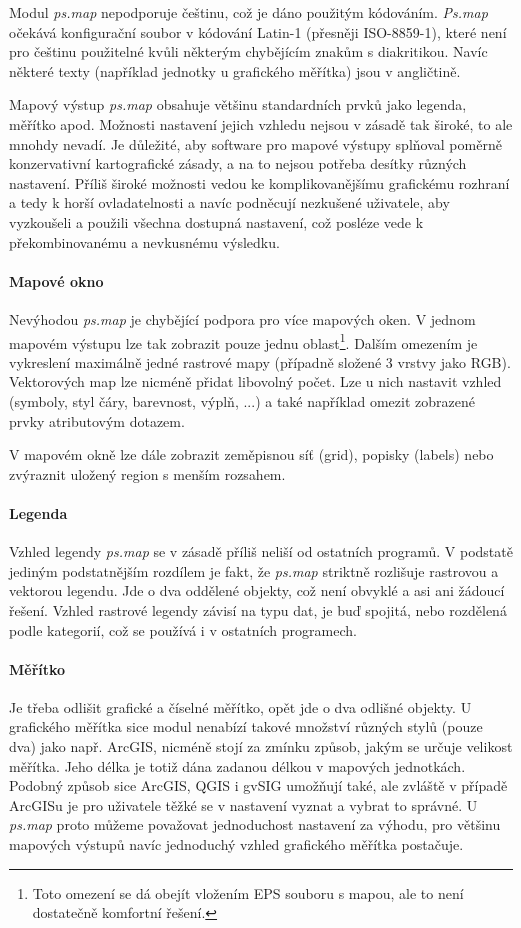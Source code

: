 \documentclass[a4paper,12pt,draft]{article}
\newcommand{\modul}[1]{\emph{#1}}
\begin{document}
Modul \modul{ps.map} nepodporuje češtinu, což je dáno použitým kódováním. \modul{Ps.map} očekává konfigurační soubor v kódování Latin-1 (přesněji ISO-8859-1), které není pro češtinu použitelné kvůli některým chybějícím znakům s diakritikou. Navíc některé texty (například jednotky u grafického měřítka) jsou v angličtině.

Mapový výstup \modul{ps.map} obsahuje většinu standardních prvků jako legenda, měřítko apod. Možnosti nastavení jejich vzhledu nejsou v zásadě tak široké, to ale mnohdy nevadí. Je důležité, aby software pro mapové výstupy splňoval poměrně konzervativní kartografické zásady, a na to nejsou potřeba desítky různých nastavení. Příliš široké možnosti vedou ke komplikovanějšímu grafickému rozhraní a tedy k horší ovladatelnosti a navíc podněcují nezkušené uživatele, aby vyzkoušeli a použili všechna dostupná nastavení, což posléze vede k překombinovanému a nevkusnému výsledku. 

\paragraph*{Mapové okno}
Nevýhodou \modul{ps.map} je chybějící podpora pro více mapových oken. V jednom mapovém výstupu lze tak zobrazit pouze jednu oblast\footnote{Toto omezení se dá obejít vložením EPS souboru s mapou, ale to není dostatečně komfortní řešení.}. Dalším omezením je vykreslení maximálně jedné rastrové mapy (případně složené 3 vrstvy jako RGB). Vektorových map lze nicméně přidat libovolný počet. Lze u nich nastavit vzhled (symboly, styl čáry, barevnost, výplň, ...) a také například omezit zobrazené prvky atributovým dotazem. 

V mapovém okně lze dále zobrazit zeměpisnou síť (grid), popisky (labels) nebo zvýraznit uložený region s menším rozsahem.

\paragraph*{Legenda}
Vzhled legendy \modul{ps.map} se v zásadě příliš neliší od ostatních programů. V podstatě jediným podstatnějším rozdílem je fakt, že \modul{ps.map} striktně rozlišuje rastrovou a vektorou legendu. Jde o dva oddělené objekty, což není obvyklé a asi ani žádoucí řešení. Vzhled rastrové legendy závisí na typu dat, je buď spojitá, nebo rozdělená podle kategorií, což se používá i v ostatních programech.

\paragraph*{Měřítko}
Je třeba odlišit grafické a číselné měřítko, opět jde o dva odlišné objekty.
U grafického měřítka sice modul nenabízí takové množství různých stylů (pouze dva) jako např. ArcGIS, nicméně stojí za zmínku způsob, jakým se určuje velikost měřítka. Jeho délka je totiž dána zadanou délkou v mapových jednotkách. Podobný způsob sice ArcGIS, QGIS i gvSIG umožňují také, ale zvláště v případě ArcGISu je pro uživatele těžké se v nastavení vyznat a vybrat to správné. U \modul{ps.map} proto můžeme považovat jednoduchost nastavení za výhodu, pro většinu mapových výstupů navíc jednoduchý vzhled grafického měřítka postačuje.
\end{document}
